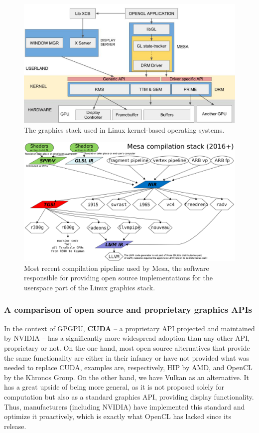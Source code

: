 \documentclass[conference, onecolumn]{IEEEtran}
\begin{document}
\begin{figure}[H]
    \centering
    \includegraphics[width=0.8\linewidth]{linux-stack.jpeg}
    \caption{The graphics stack used in Linux kernel-based operating systems.}
    \label{fig:linux-gs}
    \end{figure}

\begin{figure}[H]
    \centering
    \includegraphics[width=0.8\linewidth]{mesa.png}
    \caption{Most recent compilation pipeline used by Mesa, the software
        responsible for providing open source implementations for the userspace
        part of the Linux graphics stack.}
    \label{fig:mesa-cs}
    \end{figure}

\subsubsection{A comparison of open source and proprietary graphics APIs} \label{sec:proposal:gapis-comparison}


In the context of GPGPU, \textbf{CUDA} -- a proprietary API
projected and maintained by NVIDIA -- has a significantly more widespread
adoption than any other API, proprietary or not.
On the one hand, most open source alternatives that provide the same
functionality are either in their infancy or have not provided what was needed
to replace CUDA, examples are, respectively, HIP by AMD, and OpenCL by the
Khronos Group.
On the other hand, we have Vulkan as an alternative.
It has a great upside of being more general, as it is not proposed solely for
computation but also as a standard graphics API, providing display
functionality.
Thus, manufacturers (including NVIDIA) have implemented this standard and
optimize it proactively, which is exactly what OpenCL has lacked since its
release.
\end{document}
